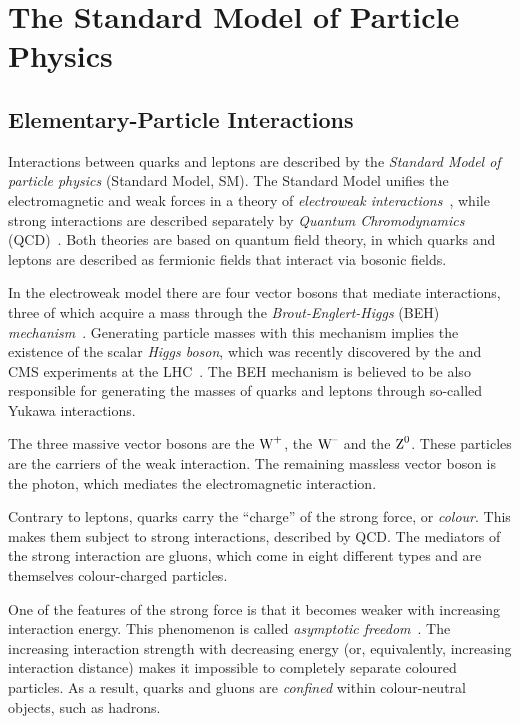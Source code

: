 \section{The Standard Model of Particle Physics}
\label{sec:intro_SM}

\subsection{Elementary-Particle Interactions}
\label{subsec:intro_SM_int}

Interactions between quarks and leptons are described by the \emph{Standard Model of particle physics} (Standard Model, SM). The Standard
Model unifies the electromagnetic and weak forces in a theory of \emph{electroweak
interactions}~\cite{Glashow:1961tr,*Weinberg:1967tq,*Salam:1968rm}, while strong interactions are described separately by \emph{Quantum
Chromodynamics} (QCD)~\cite{Fritzsch:1973pi}. Both theories are based on quantum field theory, in which quarks and leptons are described as
fermionic fields that interact via bosonic fields.

In the electroweak model there are four vector bosons that mediate interactions, three of which acquire a mass through the
\emph{Brout-Englert-Higgs} (BEH) \emph{mechanism}~\cite{Englert:1964et,*Higgs:1964ia,*Higgs:1964pj,*Guralnik:1964eu}. Generating particle
masses with this mechanism implies the existence of the scalar \emph{Higgs boson}, which was recently discovered by the \atlas{} and
CMS experiments at the LHC~\cite{Aad:2012tfa,*Chatrchyan:2012ufa}. The BEH mechanism is believed to be also responsible for generating the
masses of quarks and leptons through so-called Yukawa interactions.

The three massive vector bosons are the $\text{W}^{\text{+}}$, the $\text{W}^{\text{--}}$ and the $\text{Z}^{\text{0}}$. These particles are the carriers of the weak interaction. The
remaining massless vector boson is the photon, which mediates the electromagnetic interaction.

Contrary to leptons, quarks carry the ``charge'' of the strong force, or \emph{colour}. This makes them subject to strong interactions,
described by QCD. The mediators of the strong interaction are gluons, which come in eight different types and are themselves colour-charged
particles.

One of the features of the strong force is that it becomes weaker with increasing interaction energy. This phenomenon is called
\emph{asymptotic freedom}~\cite{Gross:1973id,*Politzer:1973fx}. The increasing interaction strength with decreasing energy (or,
equivalently, increasing interaction distance) makes it impossible to completely separate coloured particles. As a result, quarks and
gluons are \emph{confined} within colour-neutral objects, such as hadrons.

